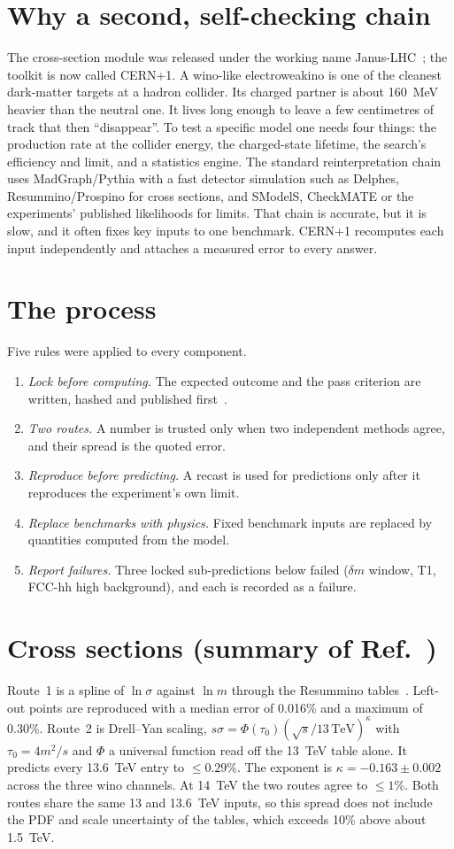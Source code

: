 \documentclass[aps,prd,twocolumn,superscriptaddress,nofootinbib,showkeys]{revtex4-2}
\begin{document}
\section{Why a second, self-checking chain}
The cross-section module was released under the working name Janus-LHC~\cite{P1}; the toolkit is now called CERN+1.
A wino-like electroweakino is one of the cleanest dark-matter targets at a hadron collider. Its charged partner is about 160~MeV heavier than the neutral one. It lives long enough to leave a few centimetres of track that then ``disappear''. To test a specific model one needs four things: the production rate at the collider energy, the charged-state lifetime, the search's efficiency and limit, and a statistics engine. The standard reinterpretation chain uses MadGraph/Pythia with a fast detector simulation such as Delphes, Resummino/Prospino for cross sections, and SModelS, CheckMATE or the experiments' published likelihoods for limits. That chain is accurate, but it is slow, and it often fixes key inputs to one benchmark. CERN+1 recomputes each input independently and attaches a measured error to every answer.

\section{The process}
Five rules were applied to every component.
\begin{enumerate}
\item \emph{Lock before computing.} The expected outcome and the pass criterion are written, hashed and published first~\cite{P4}.
\item \emph{Two routes.} A number is trusted only when two independent methods agree, and their spread is the quoted error.
\item \emph{Reproduce before predicting.} A recast is used for predictions only after it reproduces the experiment's own limit.
\item \emph{Replace benchmarks with physics.} Fixed benchmark inputs are replaced by quantities computed from the model.
\item \emph{Report failures.} Three locked sub-predictions below failed ($\delta m$ window, T1, FCC-hh high background), and each is recorded as a failure.
\end{enumerate}

\section{Cross sections (summary of Ref.~\cite{P1})}
Route~1 is a spline of $\ln\sigma$ against $\ln m$ through the Resummino tables~\cite{Res}. Left-out points are reproduced with a median error of 0.016\% and a maximum of 0.30\%. Route~2 is Drell--Yan scaling, $s\sigma=\Phi(\tau_0)(\sqrt s/13\,\mathrm{TeV})^\kappa$ with $\tau_0=4m^2/s$ and $\Phi$ a universal function read off the 13~TeV table alone. It predicts every 13.6~TeV entry to $\le0.29\%$. The exponent is $\kappa=-0.163\pm0.002$ across the three wino channels. At 14~TeV the two routes agree to $\le1\%$. Both routes share the same 13 and 13.6~TeV inputs, so this spread does not include the PDF and scale uncertainty of the tables, which exceeds 10\% above about 1.5~TeV.
\end{document}
